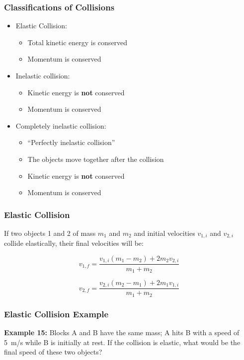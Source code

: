 \documentclass[12pt,compress,aspectratio=169]{beamer}
\begin{document}
\begin{frame}
  \frametitle{Classifications of Collisions}
  \begin{itemize}
  \item Elastic Collision:
    \begin{itemize}
    \item Total kinetic energy is conserved
    \item Momentum is conserved
    \end{itemize}
  \item Inelastic collision:
    \begin{itemize}
    \item Kinetic energy is \textbf{not} conserved
    \item Momentum is conserved
    \end{itemize}
  \item Completely inelastic collision:
    \begin{itemize}
    \item ``Perfectly inelastic collision''
    \item The objects move together after the collision
    \item Kinetic energy is \textbf{not} conserved
    \item Momentum is conserved
    \end{itemize}
  \end{itemize}
\end{frame}

\begin{frame}
  \frametitle{Elastic Collision}
  If two objects 1 and 2 of mass $m_1$ and $m_2$ and initial velocities
  $v_{1,i}$ and $v_{2,i}$ collide elastically, their final velocities will be:
  
  {\Large
    \begin{displaymath}
      v_{1,f}=\frac{v_{1,i}(m_1-m_2)+2m_2v_{2,i}}{m_1+m_2}
    \end{displaymath}
    
    \begin{displaymath}
      v_{2,f}=\frac{v_{2,i}(m_2-m_1)+2m_1v_{1,i}}{m_1+m_2}
    \end{displaymath}
  }
\end{frame}

\begin{frame}
  \frametitle{Elastic Collision Example}

  \textbf{Example 15:} Blocks A and B have the same mass; A hits B with a speed
  of \SI{5}{m/s} while B is initially at rest. If the collision is elastic,
  what would be the final speed of these two objects?
\end{frame}
\end{document}
